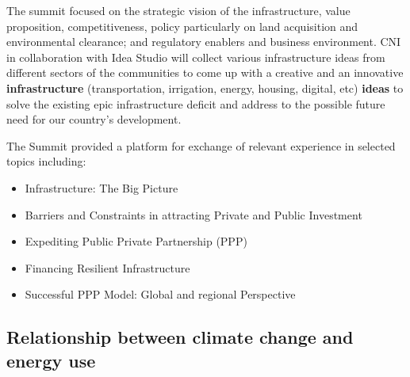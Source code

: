 \documentclass[
]{book}
\providecommand{\tightlist}{%
  \setlength{\itemsep}{0pt}\setlength{\parskip}{0pt}}
\begin{document}
The summit focused on the strategic vision of the infrastructure, value proposition, competitiveness, policy particularly on land acquisition and environmental clearance; and regulatory enablers and business environment. CNI in collaboration with Idea Studio will collect various infrastructure ideas from different sectors of the communities to come up with a creative and an innovative \textbf{infrastructure} (transportation, irrigation, energy, housing, digital, etc) \textbf{ideas} to solve the existing epic infrastructure deficit and address to the possible future need for our country's development.

The Summit provided a platform for exchange of relevant experience in selected topics including:

\begin{itemize}
\tightlist
\item
  Infrastructure: The Big Picture
\item
  Barriers and Constraints in attracting Private and Public Investment
\item
  Expediting Public Private Partnership (PPP)
\item
  Financing Resilient Infrastructure
\item
  Successful PPP Model: Global and regional Perspective
\end{itemize}

\hypertarget{relationship-between-climate-change-and-energy-use}{%
\subsection{Relationship between climate change and energy use}\label{relationship-between-climate-change-and-energy-use}}
\end{document}
